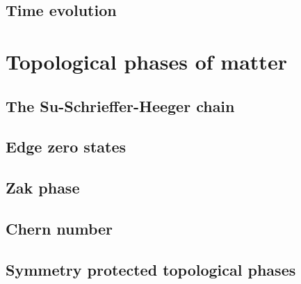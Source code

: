 \section{Time evolution}
\label{sec:time_evolution}
%
%
%
%
\chapter{Topological phases of matter}
\label{ch:topological_phases_of_matter}
%
%
\section{The Su-Schrieffer-Heeger chain}
\label{sec:the_SSH_chain}
%
%
\section{Edge zero states}
\label{sec:edge_zero_states}
%
%
\section{Zak phase}
\label{sec:zak_phase}
%
%
\section{Chern number}
\label{sec:chern_number}
%
%
\section{Symmetry protected topological phases}
\label{sec:symmetry_protected_topological_phases}
